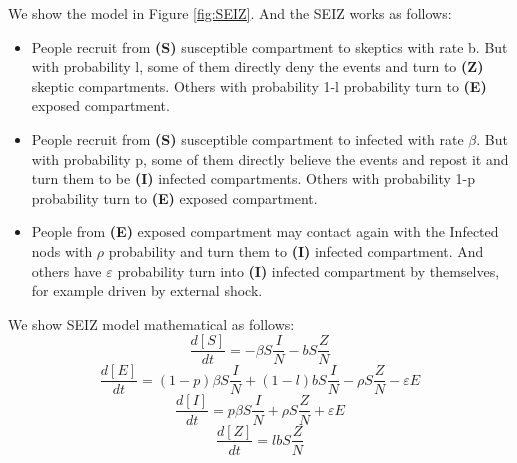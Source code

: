  We show the model in Figure \ref{fig:SEIZ}. And the SEIZ works as follows:
 

 \begin{itemize}
\item People recruit from \textbf{(S)} susceptible compartment to skeptics with rate b. But with probability l, some of them directly deny the events and turn to \textbf{(Z)} skeptic compartments. Others with probability 1-l probability turn to \textbf{(E)} exposed compartment.
\item People recruit from \textbf{(S)} susceptible compartment to infected with rate $\beta$. But with probability p, some of them directly believe the events and repost it and turn them to be \textbf{(I)} infected compartments. Others  with probability 1-p probability turn to \textbf{(E)} exposed compartment.
\item  People from \textbf{(E)} exposed compartment may contact again with the Infected nods with $\rho$ probability and turn them to \textbf{(I)} infected compartment. And others have $\varepsilon$ probability turn into \textbf{(I)} infected compartment by themselves, for example driven by external shock.
\end{itemize}




We show SEIZ model mathematical as follows:
\begin{equation}
\frac{d[S]}{dt}=- \beta S\frac{I}{N}- b S\frac{Z}{N}
\end{equation}
\begin{equation}
\frac{d[E]}{dt}=(1-p)\beta S\frac{I}{N}+(1-l) b S\frac{I}{N}-\rho  S\frac{Z}{N}-\varepsilon E
\end{equation}
\begin{equation}
\frac{d[I]}{dt}=p\beta S\frac{I}{N}+\rho  S\frac{Z}{N}+\varepsilon E
\end{equation}
\begin{equation}
\frac{d[Z]}{dt}=lbS\frac{Z}{N} 
\end{equation}

